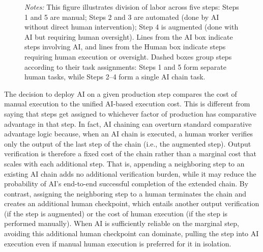 \begin{figure}[t!]
\begin{center}
  \end{center}
  \raggedright \footnotesize{
  \emph{Notes:} This figure illustrates division of labor across five steps: Steps 1 and 5 are manual; Steps 2 and 3 are automated (done by AI without direct human intervention); Step 4 is augmented (done with AI but requiring human oversight). 
  Lines from the AI box indicate steps involving AI, and lines from the Human box indicate steps requiring human execution or oversight. 
  Dashed boxes group steps according to their task assignments: Steps 1 and 5 form separate human tasks, while Steps 2–4 form a single AI chain task.
  }
  \vspace{-0.4cm}
\end{figure}

The decision to deploy AI on a given production step compares the cost of manual execution to the unified AI-based execution cost.
This is different from saying that steps get assigned to whichever factor of production has comparative advantage in that step.
In fact, AI chaining can overturn standard comparative advantage logic because, when an AI chain is executed, a human worker verifies only the output of the last step of the chain (i.e., the augmented step).
Output verification is therefore a fixed cost of the chain rather than a marginal cost that scales with each additional step.
That is, appending a neighboring step to an existing AI chain adds no additional verification burden, while it may reduce the probability of AI's end-to-end successful completion of the extended chain.
By contrast, assigning the neighboring step to a human terminates the chain and creates an additional human checkpoint, which entails another output verification (if the step is augmented) or the cost of human execution (if the step is performed manually).
When AI is sufficiently reliable on the marginal step, avoiding this additional human checkpoint can dominate, pulling the step into AI execution even if manual human execution is preferred for it in isolation.

